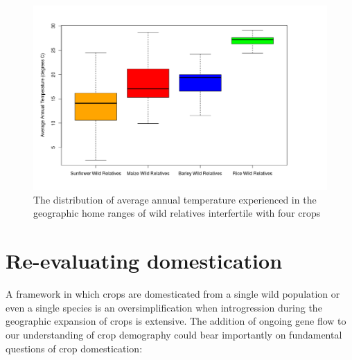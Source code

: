 \documentclass[11pt]{article}
\begin{document}
\begin{figure}[h]
	\centering
	\includegraphics[width=17.35cm]{boxplot.png}
	\caption{The distribution of average annual temperature experienced in the geographic home ranges of wild relatives interfertile with four crops}
	\label{fig:map}
\end{figure}

\section*{Re-evaluating domestication}

A framework in which crops are domesticated from a single wild population or even a single species is an oversimplification when introgression during the geographic expansion of crops is extensive.
The addition of ongoing gene flow to our understanding of crop demography could bear importantly on fundamental questions of crop domestication:
\end{document}
